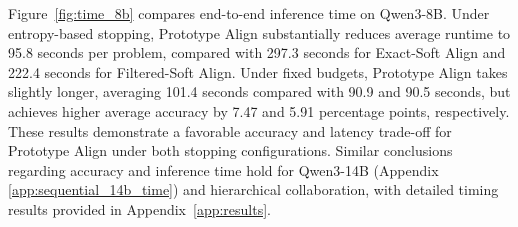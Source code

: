 \documentclass[11pt]{article}
\begin{document}
Figure~\ref{fig:time_8b} compares end-to-end inference time on Qwen3-8B. Under entropy-based stopping, Prototype Align substantially reduces average runtime to 95.8 seconds per problem, compared with 297.3 seconds for Exact-Soft Align and 222.4 seconds for Filtered-Soft Align.
Under fixed budgets, Prototype Align takes slightly longer, averaging 101.4 seconds compared with 90.9 and 90.5 seconds, but achieves higher average accuracy by 7.47 and 5.91 percentage points, respectively. These results demonstrate a favorable accuracy and latency trade-off for Prototype Align under both stopping configurations. Similar conclusions regarding accuracy and inference time hold for Qwen3-14B (Appendix \ref{app:sequential_14b_time}) and hierarchical collaboration, with detailed timing results provided in Appendix~\ref{app:results}.

\end{document}
